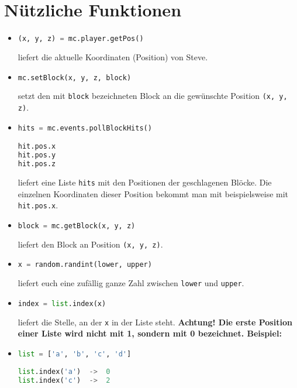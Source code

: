 \documentclass{article}
\begin{document}
	\section{Nützliche Funktionen}
	\begin{itemize}
		\item \begin{lstlisting}[language=Python]
(x, y, z) = mc.player.getPos()
		\end{lstlisting}
		liefert die aktuelle Koordinaten (Position) von Steve.
		
		\item \begin{lstlisting}[language=Python]
mc.setBlock(x, y, z, block)
		\end{lstlisting}
		setzt den mit \texttt{block} bezeichneten Block an die gewünschte Position \texttt{(x, y, z)}.
		
		\item \begin{lstlisting}[language=Python]
hits = mc.events.pollBlockHits()

hit.pos.x
hit.pos.y
hit.pos.z
		\end{lstlisting}
		liefert eine Liste \texttt{hits} mit den Positionen der geschlagenen Blöcke. Die einzelnen Koordinaten dieser Position bekommt man mit beispielsweise mit \texttt{hit.pos.x}.
		
		\item \begin{lstlisting}[language=Python]
block = mc.getBlock(x, y, z)
		\end{lstlisting}
		liefert den Block an Position \texttt{(x, y, z)}.
		
		\item \begin{lstlisting}[language=Python]
x = random.randint(lower, upper)
		\end{lstlisting}
		liefert euch eine zufällig ganze Zahl zwischen \texttt{lower} und \texttt{upper}.
		
		\item \begin{lstlisting}[language=Python]
index = list.index(x)
		\end{lstlisting}
		liefert die Stelle, an der \texttt{x} in der Liste steht. \textbf{Achtung! Die erste Position einer Liste wird nicht mit 1, sondern mit 0 bezeichnet. Beispiel:}
		\item \begin{lstlisting}[language=Python]
list = ['a', 'b', 'c', 'd']
		
list.index('a')  ->  0
list.index('c')  ->  2
		\end{lstlisting}
	\end{itemize}
\end{document}
